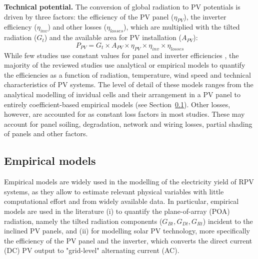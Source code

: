 \textbf{Technical potential.} The conversion of global radiation to PV potentials is driven by three factors: the efficiency of the PV panel ($\eta_{PV}$), the inverter efficiency ($\eta_\mathit{inv}$) and other losses ($\eta_\mathit{losses}$), which are multiplied with the tilted radiation ($G_t$) and the available area for PV installation ($A_{PV}$):
\begin{equation}
    P_{PV} = G_t \times A_{PV} \times \eta_{PV} \times \eta_\mathit{inv} \times \eta_\mathit{losses}
\end{equation}
While few studies use constant values for panel and inverter efficiencies \cite{assouline_quantifying_2017,assouline_large-scale_2018,klauser_solarpotentialanalyse_2016}, the majority of the reviewed studies use analytical or empirical models to quantify the efficiencies as a function of radiation, temperature, wind speed and technical characteristics of PV systems. The level of detail of these models ranges from the analytical modelling of invidual cells and their arrangement in a PV panel \cite{buffat_scalable_2018} to entirely coefficient-based empirical models \cite{mainzer_assessment_2017} (see Section~\ref{phys_models}). Other losses, however, are accounted for as constant loss factors in most studies. These may account for panel soiling, degradation, network and wiring losses, partial shading of panels and other factors.

\subsection{Empirical models}
\label{phys_models}

Empirical models are widely used in the modelling of the electricity yield of RPV systems, as they allow to estimate relevant physical variables with little computational effort and from widely available data. 
In particular, empirical models are used in the literature (i) to quantify the plane-of-array (POA) radiation, namely the tilted radiation components ($G_{Bt}, G_{Dt}, G_{Rt}$) incident to the inclined PV panels, and (ii) for modelling solar PV technology, more specifically the efficiency of the PV panel and the inverter, which converts the direct current (DC) PV output to "grid-level" alternating current (AC). 


